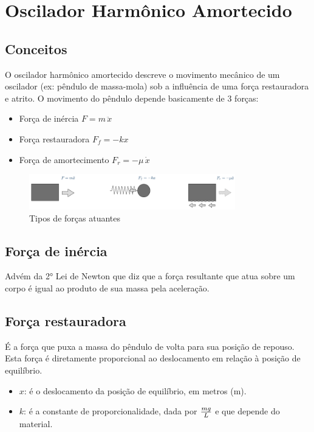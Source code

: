 \section{Oscilador Harmônico Amortecido}

\subsection{Conceitos}
O oscilador harmônico amortecido descreve o movimento mecânico de um oscilador (ex: pêndulo de massa-mola) sob a influência de uma força restauradora e atrito. O movimento do pêndulo depende basicamente de 3 forças:

\begin{itemize}	
\item Força de inércia $F = m \, \ddot{x}$
\item Força restauradora $F_{f} = -kx$
\item Força de amortecimento $F_{r} = -\mu \, \dot{x}$
\end{itemize}

\begin{figure}[H]
	\centering
	\includegraphics[width=0.8\textwidth]{./Imagens/Oscilador/OH1.png} 
	\caption{Tipos de forças atuantes}
	\label{fig:OH1}
\end{figure}

\subsection{Força de inércia}
Advém da 2° Lei de Newton que diz que a força resultante que atua sobre um corpo é igual ao produto de sua massa pela aceleração.

\subsection{Força restauradora}
É a força que puxa a massa do pêndulo de volta para sua posição de repouso. Esta força é diretamente proporcional ao deslocamento em relação à posição de equilíbrio.

\begin{itemize} 
\item $x$: é o deslocamento da posição de equilíbrio, em metros (m).
\item $k$: é a constante de proporcionalidade, dada por $\large \frac{mg}{L}$ e que depende do material.
\end{itemize}

